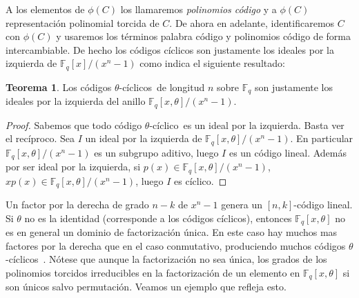 \documentclass[a4paper,11pt]{article}
\numberwithin{equation}{section}
\theoremstyle{definition} %
\newtheorem{teorema}{Teorema}[section]
\newcommand{\Fq}{\mathbb{F}_q}
\newcommand{\Fx}{\Fq[x]/(x^n - 1)}
\newcommand{\Fqxo}{\Fq[x, \theta]}
\newcommand{\Fxx}{\Fq[x, \theta]/(x^n - 1)}
\newcommand{\tc}{$\theta$-cíclico\ }
\newcommand{\tcs}{$\theta$-cíclicos\ }
\begin{document}
    A los elementos de $\phi(C)$ los llamaremos \emph{polinomios código} y a $\phi(C)$ representación polinomial torcida de $C$. De ahora en adelante, identificaremos $C$ con $\phi(C)$ y usaremos los términos palabra código y polinomios código de forma intercambiable. De hecho los códigos cíclicos son justamente los ideales por la izquierda de $\Fx$ como indica el siguiente resultado:

    \begin{teorema}
        Los códigos \tcs de longitud $n$ sobre $\Fq$ son justamente los ideales por la izquierda del anillo $\Fxx$.
    \end{teorema}
    \begin{proof}
        Sabemos que todo código \tc es un ideal por la izquierda. Basta ver el recíproco. Sea $I$ un ideal por la izquierda de $\Fxx$. En particular $\Fxx$ es un subgrupo aditivo, luego $I$ es un código lineal. Además por ser ideal por la izquierda, si $p(x) \in \Fxx$, $x p(x) \in \Fxx$, luego $I$ es cíclico.
    \end{proof}

    Un factor por la derecha de grado $n - k$ de $x^n - 1$ genera un $[n, k]$-código lineal.   Si $\theta$ no es la identidad (corresponde a los códigos cíclicos), entonces $\Fqxo$ no es en general un dominio de factorización única. En este caso hay muchos mas factores por la derecha que en el caso conmutativo, produciendo muchos códigos \tcs. Nótese que aunque la factorización no sea única, los grados de los polinomios torcidos irreducibles en la factorización de un elemento en $\Fqxo$ si son únicos salvo permutación. Veamos un ejemplo que refleja esto.
\end{document}
